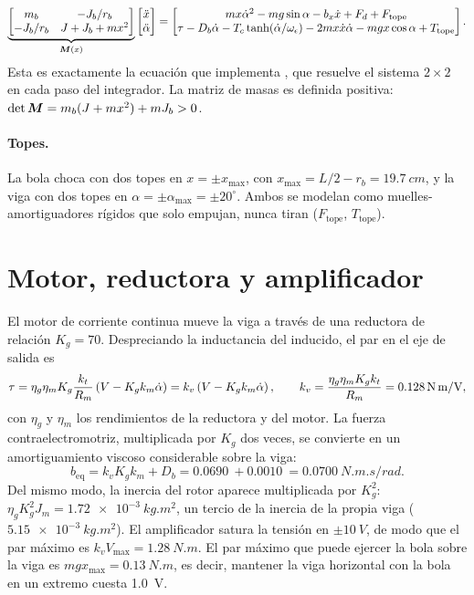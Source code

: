 \begin{equation}
  \underbrace{\begin{bmatrix} m_b & -J_b/r_b\\ -J_b/r_b & J+J_b+mx^2\end{bmatrix}}_{\bm{M}(x)}
  \begin{bmatrix}\ddot{x}\\ \ddot{\alpha}\end{bmatrix}
  =
  \begin{bmatrix}
    m x\dot{\alpha}^2 - m g\sin\alpha - b_x\dot{x} + F_d + F_{\text{tope}}\\
    \tau - D_b\dot{\alpha} - T_c\tanh(\dot{\alpha}/\omega_\epsilon) - 2m x\dot{x}\dot{\alpha} - m g x\cos\alpha + T_{\text{tope}}
  \end{bmatrix}.
  \label{eq:nl}
\end{equation}
Esta es exactamente la ecuación que implementa , que resuelve el sistema $2\times2$ en cada paso del integrador. La matriz de masas es definida positiva: $\det\bm{M} = m_b(J+mx^2) + mJ_b > 0$.

\paragraph{Topes.} La bola choca con dos topes en $x=\pm x_{\max}$, con $x_{\max}=L/2-r_b=\SI{19.7}{cm}$, y la viga con dos topes en $\alpha=\pm\alpha_{\max}=\pm20^\circ$. Ambos se modelan como muelles-amortiguadores rígidos que solo empujan, nunca tiran ($F_{\text{tope}}$, $T_{\text{tope}}$).

\section{Motor, reductora y amplificador}

El motor de corriente continua mueve la viga a través de una reductora de relación $K_g=70$. Despreciando la inductancia del inducido, el par en el eje de salida es
\begin{equation}
  \tau = \eta_g\eta_m K_g\frac{k_t}{R_m}\left(V - K_gk_m\dot{\alpha}\right) = k_v\left(V - K_gk_m\dot{\alpha}\right),
  \qquad k_v = \frac{\eta_g\eta_mK_gk_t}{R_m}=\SI{0.128}{N.m/V},
  \label{eq:motor}
\end{equation}
con $\eta_g$ y $\eta_m$ los rendimientos de la reductora y del motor. La fuerza contraelectromotriz, multiplicada por $K_g$ dos veces, se convierte en un amortiguamiento viscoso considerable sobre la viga:
\begin{equation}
  b_{\text{eq}} = k_vK_gk_m + D_b = \SI{0.0690}{} + \SI{0.0010}{} = \SI{0.0700}{N.m.s/rad}.
\end{equation}
Del mismo modo, la inercia del rotor aparece multiplicada por $K_g^2$: $\eta_gK_g^2J_m=\SI{1.72e-3}{kg.m^2}$, un tercio de la inercia de la propia viga ($\SI{5.15e-3}{kg.m^2}$). El amplificador satura la tensión en $\pm\SI{10}{V}$, de modo que el par máximo es $k_vV_{\max}=\SI{1.28}{N.m}$. El par máximo que puede ejercer la bola sobre la viga es $mgx_{\max}=\SI{0.13}{N.m}$, es decir, mantener la viga horizontal con la bola en un extremo cuesta \SI{1.0}{V}.

